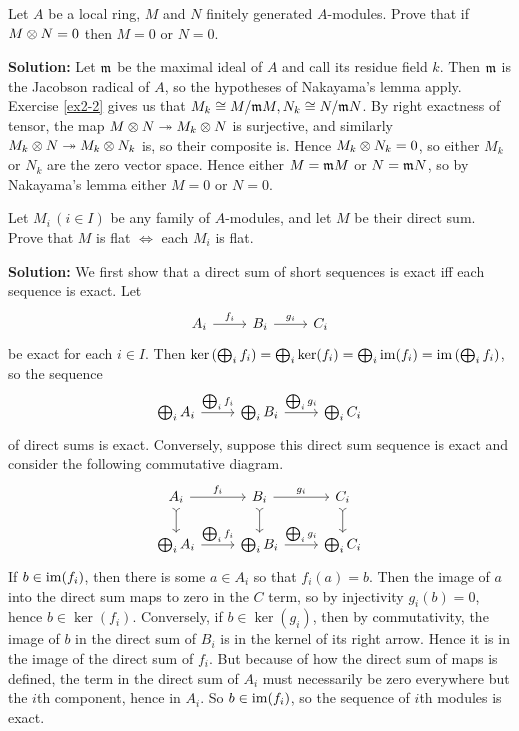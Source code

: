 \documentclass{article}
\begin{document}
\begin{exercise}
    Let \(A\) be a local ring, \(M\) and \(N\) finitely generated \(A\)-modules.
    Prove that if \(M \otimes N = 0\) then \(M = 0\) or \(N = 0\).
\end{exercise}

\noindent\textbf{Solution:}
Let \(\mathfrak{m}\) be the maximal ideal of \(A\) and call its residue field \(k\).
Then \(\mathfrak{m}\) is the Jacobson radical of \(A\), so the hypotheses of Nakayama's lemma apply.
Exercise \ref{ex2-2} gives us that \(M_k \cong M/\mathfrak{m} M, N_k \cong N/\mathfrak{m} N\).
By right exactness of tensor, the map \(M \otimes N \twoheadrightarrow M_k \otimes N\) is surjective, and similarly \(M_k \otimes N \twoheadrightarrow M_k \otimes N_k\) is, so their composite is.
Hence \(M_k \otimes N_k = 0\), so either \(M_k\) or \(N_k\) are the zero vector space.
Hence either \(M = \mathfrak{m} M\) or \(N = \mathfrak{m} N\), so by Nakayama's lemma either \(M = 0\) or \(N = 0\).

\begin{exercise} \label{ex2-3}
    Let \(M_i \, (i \in I)\) be any family of \(A\)-modules, and let \(M\) be their direct sum.
    Prove that \(M\) is flat \(\iff\) each \(M_i\) is flat.
\end{exercise}

\noindent\textbf{Solution:}
We first show that a direct sum of short sequences is exact iff each sequence is exact.
Let
\[
    \begin{tikzcd}
        A_i \arrow[r, "f_i"] & B_i \arrow[r, "g_i"] & C_i
    \end{tikzcd}
\]
be exact for each \(i \in I\).
Then \(\ker\left(\bigoplus_i f_i\right) = \bigoplus_i \ker(f_i) = \bigoplus_i \operatorname{im}(f_i) = \operatorname{im}\left(\bigoplus_i f_i\right)\), so the sequence
\[
    \begin{tikzcd}
        \bigoplus_i A_i \arrow[r, "\bigoplus_i f_i"] & \bigoplus_i B_i \arrow[r, "\bigoplus_i g_i"] & \bigoplus_i C_i
    \end{tikzcd}
\]
of direct sums is exact.
Conversely, suppose this direct sum sequence is exact and consider the following commutative diagram.
\[
    \begin{tikzcd}
        A_i \arrow[r, "f_i"] \arrow[d, tail] & B_i \arrow[r, "g_i"] \arrow[d, tail] & C_i \arrow[d, tail] \\
        \bigoplus_i A_i \arrow[r, "\bigoplus_i f_i"] & \bigoplus_i B_i \arrow[r, "\bigoplus_i g_i"] & \bigoplus_i C_i
    \end{tikzcd}
\]
If \(b \in \operatorname{im}(f_i)\), then there is some \(a \in A_i\) so that \(f_i(a) = b\).
Then the image of \(a\) into the direct sum maps to zero in the \(C\) term, so by injectivity \(g_i(b) = 0\), hence \(b \in \ker(f_i)\).
Conversely, if \(b \in \ker(g_i)\), then by commutativity, the image of \(b\) in the direct sum of \(B_i\) is in the kernel of its right arrow.
Hence it is in the image of the direct sum of \(f_i\).
But because of how the direct sum of maps is defined, the term in the direct sum of \(A_i\) must necessarily be zero everywhere but the \(i\)th component, hence in \(A_i\).
So \(b \in \operatorname{im}(f_i)\), so the sequence of \(i\)th modules is exact.
\end{document}
